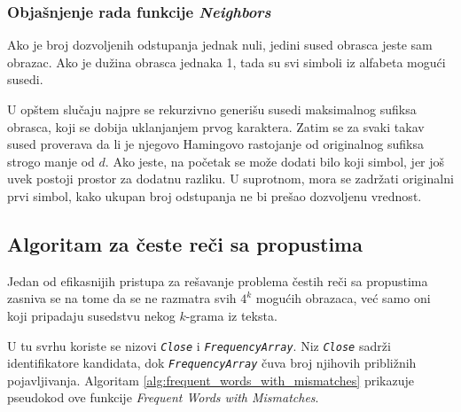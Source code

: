 \documentclass[12pt,oneside]{memoir}
\begin{document}
\begin{algorithm}[h]
\caption{Neighbors}
\label{alg:neighbors}
\SetAlgoLined
\DontPrintSemicolon
{}
\end{algorithm}

\subsubsection{Objašnjenje rada funkcije \textit{Neighbors}}

Ako je broj dozvoljenih odstupanja jednak nuli, jedini sused obrasca jeste sam obrazac. Ako je dužina obrasca jednaka 1, tada su svi simboli iz alfabeta mogući susedi.

U opštem slučaju najpre se rekurzivno generišu susedi maksimalnog sufiksa obrasca, koji se dobija uklanjanjem prvog karaktera. Zatim se za svaki takav sused proverava da li je njegovo Hamingovo rastojanje od originalnog sufiksa strogo manje od $d$. Ako jeste, na početak se može dodati bilo koji simbol, jer još uvek postoji prostor za dodatnu razliku. U suprotnom, mora se zadržati originalni prvi simbol, kako ukupan broj odstupanja ne bi prešao dozvoljenu vrednost.

\subsection{Algoritam za česte reči sa propustima}

Jedan od efikasnijih pristupa za rešavanje problema čestih reči sa propustima zasniva se na tome da se ne razmatra svih $4^k$ mogućih obrazaca, već samo oni koji pripadaju susedstvu nekog $k$-grama iz teksta.

U tu svrhu koriste se nizovi \textit{\texttt{Close}} i \textit{\texttt{FrequencyArray}}. Niz \textit{\texttt{Close}} sadrži identifikatore kandidata, dok \textit{\texttt{FrequencyArray}} čuva broj njihovih približnih pojavljivanja. Algoritam \ref{alg:frequent_words_with_mismatches} prikazuje pseudokod ove funkcije \textit{Frequent Words with Mismatches}.
\end{document}
